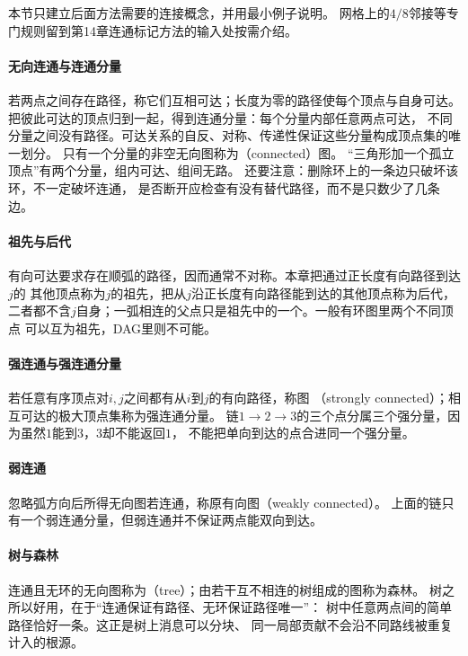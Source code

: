 本节只建立后面方法需要的连接概念，并用最小例子说明。
网格上的$4/8$邻接等专门规则留到第14章连通标记方法的输入处按需介绍。

\paragraph{无向连通与连通分量}
若两点之间存在路径，称它们互相可达；长度为零的路径使每个顶点与自身可达。
把彼此可达的顶点归到一起，得到连通分量：每个分量内部任意两点可达，
不同分量之间没有路径。可达关系的自反、对称、传递性保证这些分量构成顶点集的唯一划分。
只有一个分量的非空无向图称为（connected）图。
“三角形加一个孤立顶点”有两个分量，组内可达、组间无路。
还要注意：删除环上的一条边只破坏该环，不一定破坏连通，
是否断开应检查有没有替代路径，而不是只数少了几条边。

\paragraph{祖先与后代}
有向可达要求存在顺弧的路径，因而通常不对称。本章把通过正长度有向路径到达$j$的
其他顶点称为$j$的祖先，把从$j$沿正长度有向路径能到达的其他顶点称为后代，
二者都不含$j$自身；一弧相连的父点只是祖先中的一个。一般有环图里两个不同顶点
可以互为祖先，DAG里则不可能。

\paragraph{强连通与强连通分量}
若任意有序顶点对$i,j$之间都有从$i$到$j$的有向路径，称图
（strongly connected）；相互可达的极大顶点集称为强连通分量。
链$1\to2\to3$的三个点分属三个强分量，因为虽然$1$能到$3$，$3$却不能返回$1$，
不能把单向到达的点合进同一个强分量。

\paragraph{弱连通}
忽略弧方向后所得无向图若连通，称原有向图（weakly connected）。
上面的链只有一个弱连通分量，但弱连通并不保证两点能双向到达。

\paragraph{树与森林}
连通且无环的无向图称为（tree）；由若干互不相连的树组成的图称为森林。
树之所以好用，在于“连通保证有路径、无环保证路径唯一”：
树中任意两点间的简单路径恰好一条。这正是树上消息可以分块、
同一局部贡献不会沿不同路线被重复计入的根源。

